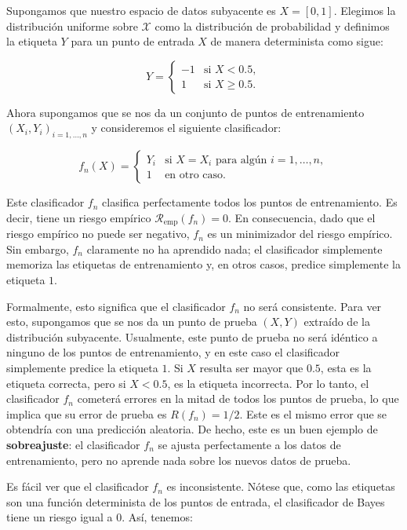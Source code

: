 \documentclass{report}
\begin{document}
Supongamos que nuestro espacio de datos subyacente es \(X = [0,1]\). Elegimos la distribución uniforme sobre
\(\mathcal{X}\) como la distribución de probabilidad y definimos la etiqueta \(Y\) para un punto de entrada \(X\) de
manera determinista como sigue:

\[
Y =
\begin{cases}
-1 & \text{si } X < 0.5, \\
1 & \text{si } X \geq 0.5.
\end{cases}
\]

Ahora supongamos que se nos da un conjunto de puntos de entrenamiento \((X_i, Y_i)_{i=1,\dots,n}\) y
consideremos el siguiente clasificador:

\[
f_n(X) =
\begin{cases}
Y_i & \text{si } X = X_i \text{ para algún } i = 1, \dots, n, \\
1 & \text{en otro caso.}
\end{cases}
\]

Este clasificador \(f_n\) clasifica perfectamente todos los puntos de entrenamiento. Es decir, tiene un
riesgo empírico \(\mathcal{R}_{\text{emp}}(f_n) = 0\). En consecuencia, dado que el riesgo empírico no puede ser
negativo, \(f_n\) es un minimizador del riesgo empírico. Sin embargo, \(f_n\) claramente no ha aprendido
nada; el clasificador simplemente memoriza las etiquetas de entrenamiento y, en otros casos, predice
simplemente la etiqueta \(1\).

Formalmente, esto significa que el clasificador \(f_n\) no será consistente. Para ver esto, supongamos que
se nos da un punto de prueba \((X, Y)\) extraído de la distribución subyacente. Usualmente, este punto de
prueba no será idéntico a ninguno de los puntos de entrenamiento, y en este caso el clasificador simplemente
predice la etiqueta \(1\). Si \(X\) resulta ser mayor que \(0.5\), esta es la etiqueta correcta, pero si
\(X < 0.5\), es la etiqueta incorrecta. Por lo tanto, el clasificador \(f_n\) cometerá errores en la mitad
de todos los puntos de prueba, lo que implica que su error de prueba es \(R(f_n) = 1/2\). Este es el mismo
error que se obtendría con una predicción aleatoria. De hecho, este es un buen ejemplo de
\textbf{sobreajuste}: el clasificador \(f_n\) se ajusta perfectamente a los datos de entrenamiento, pero no
aprende nada sobre los nuevos datos de prueba.

Es fácil ver que el clasificador \(f_n\) es inconsistente. Nótese que, como las etiquetas son una función
determinista de los puntos de entrada, el clasificador de Bayes tiene un riesgo igual a \(0\). Así, tenemos:
\end{document}
